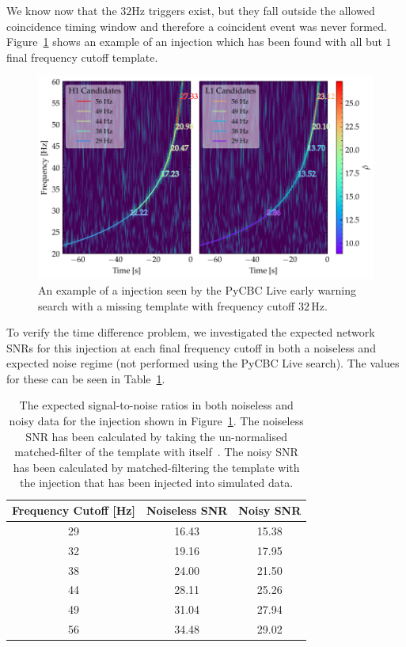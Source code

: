 We know now that the $32$Hz triggers exist, but they fall outside the allowed coincidence timing window and therefore a coincident event was never formed. Figure~\ref{6:fig:missing-freq-eg} shows an example of an injection which has been found with all but $1$ final frequency cutoff template. 
%
\begin{figure}
    \centering
    \includegraphics[width=1.0\linewidth]{images/6_earlywarning/stories/missing_freqs_example.pdf}
    \caption{An example of a \gwadj injection seen by the PyCBC Live early warning search with a missing template with frequency cutoff $32 \, \text{Hz}$.}
    \label{6:fig:missing-freq-eg}
\end{figure}
%
To verify the time difference problem, we investigated the expected network SNRs for this injection at each final frequency cutoff in both a noiseless and expected noise regime (not performed using the PyCBC Live search). The values for these can be seen in Table~\ref{6:tab:noise_snrs}.
%
\begin{table}[ht]
    \centering
    \setlength{\tabcolsep}{4pt}
    \begin{tabular}{ccc}
        \toprule
        \textbf{Frequency Cutoff [Hz]} & \textbf{Noiseless SNR} & \textbf{Noisy SNR} \\
        \midrule
        29 & 16.43 & 15.38 \\
        32 & 19.16 & 17.95 \\
        38 & 24.00 & 21.50 \\
        44 & 28.11 & 25.26 \\
        49 & 31.04 & 27.94 \\
        56 & 34.48 & 29.02 \\
        \bottomrule
    \end{tabular}
    \caption{The expected signal-to-noise ratios in both noiseless and noisy data for the \gwadj injection shown in Figure~\ref{6:fig:missing-freq-eg}. The noiseless SNR has been calculated by taking the un-normalised matched-filter of the template with itself~\cite{Brown_Thesis:2004}. The noisy SNR has been calculated by matched-filtering the template with the injection that has been injected into simulated \gwadj data.}
    \label{6:tab:noise_snrs}
\end{table}
